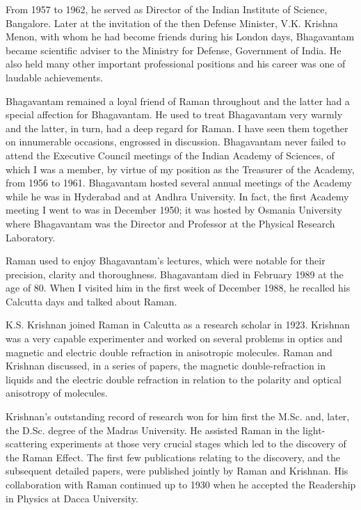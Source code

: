 From 1957 to 1962, he served as Director of the Indian Institute of Science, Bangalore. Later at the invitation of the then Defense Minister, V.K. Krishna Menon, with whom he had become friends during his London days, Bhagavantam became scientific adviser to the Ministry for Defense, Government of India. He also held many other important professional positions and his career was one of laudable achievements.

Bhagavantam remained a loyal friend of Raman throughout and the latter had a special affection for Bhagavantam. He used to treat Bhagavantam very warmly and the latter, in turn, had a deep regard for Raman. I have seen them together on innumerable occasions, engrossed in discussion. Bhagavantam never failed to attend the Executive Council meetings of the Indian Academy of Sciences, of which I was a member, by virtue of my position as the Treasurer of the Academy, from 1956 to 1961. Bhagavantam hosted several annual meetings of the Academy while he was in Hyderabad and at Andhra University. In fact, the first Academy meeting I went to was in December 1950; it was hosted by Osmania University where Bhagavantam was the Director and Professor at the Physical Research Laboratory.

Raman used to enjoy Bhagavantam's lectures, which were notable for their precision, clarity and thoroughness. Bhagavantam died in February 1989 at the age of 80. When I visited him in the first week of December 1988, he recalled his Calcutta days and talked about Raman.

\medskip
{}
\smallskip

\noindent
K.S. Krishnan joined Raman in Calcutta as a research scho\-lar in 1923. Krishnan was a very capable experimenter and worked on several problems in optics and magnetic and electric double refraction in anisotropic molecules. Raman and Krishnan discussed, in a series of papers, the magnetic double-refraction in liquids and the electric double refraction in relation to the polarity and optical anisotropy of molecules.

Krishnan's outstanding record of research won for him first the M.Sc. and, later, the D.Sc. degree of the Madras University. He assisted Raman in the light-scattering experiments at those very crucial stages which led to the discovery of the Raman Effect. The first few publications relating to the discovery, and the subsequent detailed papers, were published jointly by Raman and Krishnan. His collaboration with Raman continued up to 1930 when he accepted the Readership in Physics at Dacca University.

